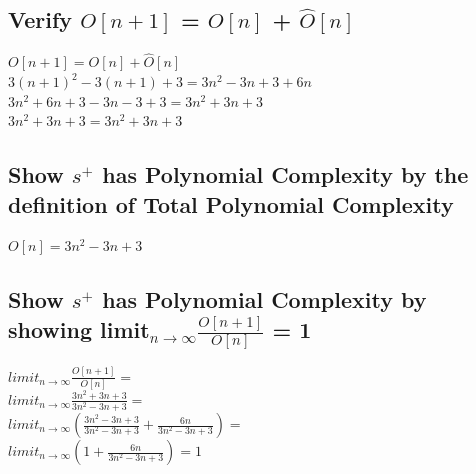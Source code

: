 \documentclass[11pt]{article}
\begin{document}
\subsection{Verify $O[n+1]$ = $O[n]$ + $\hat{O}[n]$}
\begin{center}
$
O[n+1] = O[n] + \hat{O}[n]
$
\\ \vspace{2mm}
$
3(n+1)^2 -3(n+1) + 3 =  3n^2 -3n + 3 + 6n
$
\\ \vspace{2mm}
$
3n^2 + 6n + 3 - 3n -3 + 3 = 3n^2 + 3n + 3
$
\\ \vspace{2mm}
$
3n^2 + 3n+ 3 = 3n^2 + 3n + 3
$
\end{center}







\subsection{Show $s^+$ has Polynomial Complexity by the definition of Total Polynomial Complexity}
\begin{center}
\vspace{2mm}
$
O[n] = 3n^2 -3n + 3
$
\end{center}

\subsection{Show $s^+$ has Polynomial Complexity by showing limit$_{n \rightarrow \infty}\frac{O[n+1]}{O[n]}$ = 1}
\begin{center}
$
limit_{n \rightarrow \infty}\frac{O[n+1]}{O[n]} =
$
\\ \vspace{2mm}
$
limit_{n \rightarrow \infty}\frac{3n^2 + 3n + 3}{3n^2 - 3n + 3} =
$
\\ \vspace{2mm}
$
limit_{n \rightarrow \infty}(\frac{3n^2 - 3n + 3}{3n^2 - 3n + 3} + \frac{6n}{3n^2 - 3n + 3}) =
$
\\ \vspace{2mm}
$
limit_{n \rightarrow \infty}(1 + \frac{6n }{3n^2 - 3n + 3}) = 1
$
\end{center}









\newpage
\end{document}
